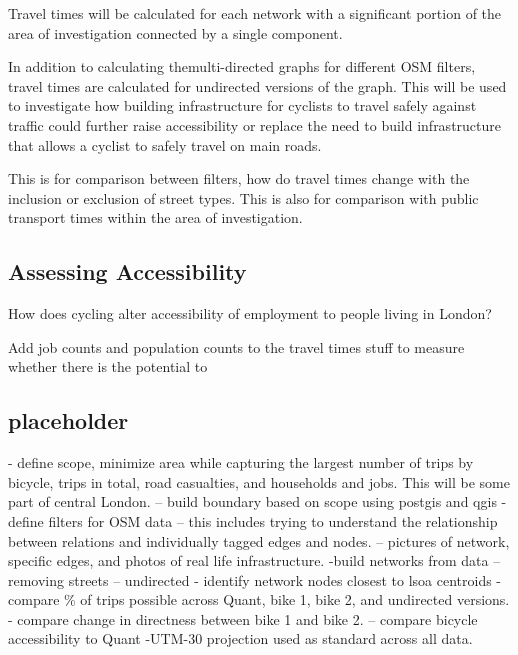 \documentclass[11pt]{article} %
\begin{document}
Travel times will be calculated for each network with a significant portion of the area of investigation connected by a single component.

In addition to calculating themulti-directed graphs for different OSM filters, travel times are calculated for undirected versions of the graph. This will be used to investigate how building infrastructure for cyclists to travel safely against traffic could further raise accessibility or replace the need to build infrastructure that allows a cyclist to safely travel on main roads. 

 This is for comparison between filters, how do travel times change with the inclusion or exclusion of street types. This is also for comparison with public transport times within the area of investigation. 

 \subsection{Assessing Accessibility}
 
How does cycling alter accessibility of employment to people living in London? 

Add job counts and population counts to the travel times stuff to measure whether there is the potential to 

\subsection{placeholder}

- define scope, minimize area while capturing the largest number of trips by bicycle, trips in total, road casualties, and households and jobs. This will be some part of central London. 
-- build boundary based on scope using postgis and qgis
- define filters for OSM data
-- this includes trying to understand the relationship between relations and individually tagged edges and nodes. 
-- pictures of network, specific edges, and photos of real life infrastructure. 
-build networks from data
-- removing streets
-- undirected
- identify network nodes closest to lsoa centroids
-compare \% of trips possible across Quant, bike 1, bike 2, and undirected versions. 
- compare change in directness between bike 1 and bike 2.  
-- compare bicycle accessibility to Quant
-UTM-30 projection used as standard across all data. 
\end{document}
